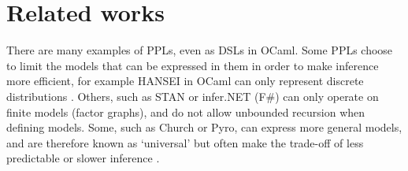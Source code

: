 \section{Related works}
There are many examples of PPLs, even as DSLs in OCaml. Some PPLs choose to limit the models that can be expressed in them in order to make inference more efficient, for example HANSEI in OCaml can only represent discrete distributions \cite{kiselyov2009embedded}. Others, such as STAN or infer.NET (F\#) can only operate on finite models (factor graphs), and do not allow unbounded recursion when defining models. Some, such as Church or Pyro, can express more general models, and are therefore known as `universal' \cite{} but often make the trade-off of less predictable or slower inference \cite{}.



